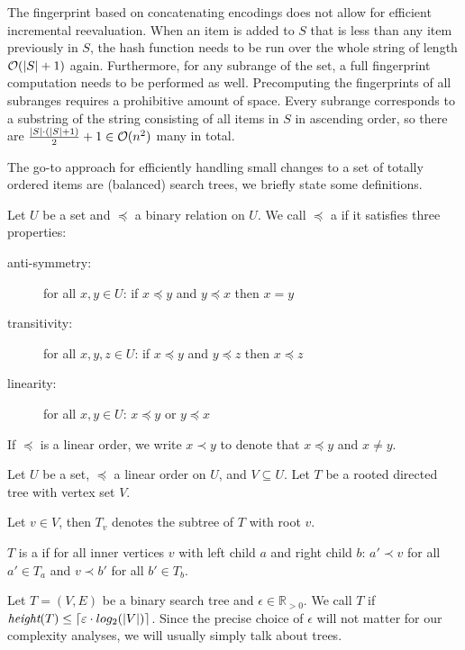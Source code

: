 The fingerprint based on concatenating encodings does not allow for efficient incremental reevaluation. When an item is added to $S$ that is less than any item previously in $S$, the hash function needs to be run over the whole string of length $\complexity{\abs{S} + 1}$ again. Furthermore, for any subrange of the set, a full fingerprint computation needs to be performed as well. Precomputing the fingerprints of all subranges requires a prohibitive amount of space. Every subrange corresponds to a substring of the string consisting of all items in $S$ in ascending order, so there are $\frac{\abs{S} \cdot (\abs{S} + 1)}{2} + 1 \in \complexity{n^2}$ many in total.

The go-to approach for efficiently handling small changes to a set of totally ordered items are (balanced) search trees, we briefly state some definitions.

\begin{definition}
Let $U$ be a set and $\preceq$ a binary relation on $U$.
We call $\preceq$ a  if it satisfies three properties:

  \begin{description}
    \item[anti-symmetry:] for all $x, y \in U$: if $x \preceq y$ and $y \preceq x$ then $x = y$
    \item[transitivity:] for all $x, y, z \in U$: if $x \preceq y$ and $y \preceq z$ then $x \preceq z$
    \item[linearity:] for all $x, y \in U$: $x \preceq y$ or $y \preceq x$
  \end{description}

If $\preceq$ is a linear order, we write $x \prec y$ to denote that $x \preceq y$ and $x \neq y$.
\end{definition}

\begin{definition}
Let $U$ be a set, $\preceq$ a linear order on $U$, and $V \subseteq U$. Let $T$ be a rooted directed tree with vertex set $V$.

Let $v \in V$, then $T_v$ denotes the subtree of $T$ with root $v$.

$T$ is a  if for all inner vertices $v$ with left child $a$ and right child $b$: $a' \prec v$ for all $a' \in T_a$ and $v \prec b'$ for all $b' \in T_b$.

\end{definition}

\begin{definition}
Let $T = (V, E)$ be a binary search tree and $\epsilon \in \mathbb{R}_{> 0}$.
We call $T$  if $\textit{height}(T) \leq \ceil*{\epsilon \cdot log_2(|V|)}$.
Since the precise choice of $\epsilon$ will not matter for our complexity analyses, we will usually simply talk about  trees.
\end{definition}

